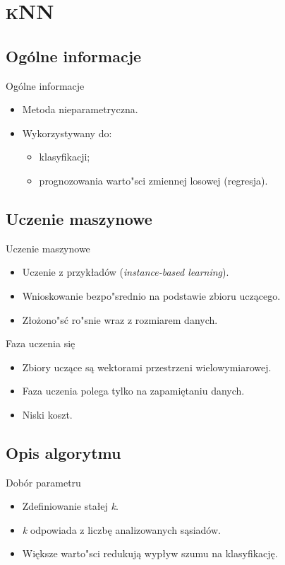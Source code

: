 \section{\scshape kNN}

\subsection{Ogólne informacje}
\begin{frame}{Ogólne informacje}
\begin{itemize}
	\item Metoda nieparametryczna.
	\item Wykorzystywany do:
	\begin{itemize}
		\item klasyfikacji;
		\item prognozowania warto"sci zmiennej losowej (regresja).
	\end{itemize}
\end{itemize}
\end{frame}

\subsection{Uczenie maszynowe}
\begin{frame}{Uczenie maszynowe}
\begin{itemize}
	\item Uczenie z przykładów (\emph{instance-based learning}).
	\item Wnioskowanie bezpo"srednio na podstawie zbioru uczącego.
	\item Złożono"sć ro"snie wraz z rozmiarem danych.
\end{itemize}
\end{frame}

\begin{frame}{Faza uczenia się}
\begin{itemize}
	\item Zbiory uczące są wektorami przestrzeni wielowymiarowej.
	\item Faza uczenia polega tylko na zapamiętaniu danych.
	\item Niski koszt.
\end{itemize}
\end{frame}

\subsection{Opis algorytmu}
\begin{frame}{Dobór parametru}
\begin{itemize}
	\item Zdefiniowanie stałej \emph{k}.
	\item \emph{k} odpowiada z liczbę analizowanych sąsiadów.
	\item Większe warto"sci redukują wypływ szumu na klasyfikację.
\end{itemize}
\end{frame}

